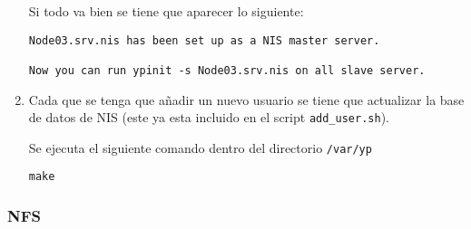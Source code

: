 \documentclass[../main.tex]{subfiles}
\begin{document}
\begin{enumerate}
  Si todo va bien se tiene que aparecer lo siguiente:

  \begin{lstlisting}
Node03.srv.nis has been set up as a NIS master server.

Now you can run ypinit -s Node03.srv.nis on all slave server.
\end{lstlisting}
  
\item Cada que se tenga  que añadir un nuevo usuario se
  tiene que actualizar la base de datos de NIS\@
  (este ya esta incluido en el script \lstinline|add_user.sh|).

  Se ejecuta el siguiente comando dentro del directorio
  \lstinline|/var/yp|

  \begin{lstlisting}
make
\end{lstlisting}
  
\end{enumerate}

\subsubsection{NFS}\label{sec:nfs}
\end{document}
